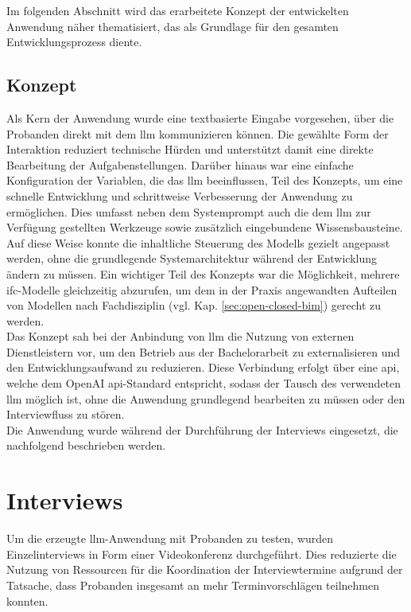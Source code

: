Im folgenden Abschnitt wird das erarbeitete Konzept der entwickelten Anwendung näher thematisiert, das als Grundlage für den gesamten Entwicklungsprozess diente.

\subsection{Konzept}
\label{sec:app-concept}

Als Kern der Anwendung wurde eine textbasierte Eingabe vorgesehen, über die Probanden direkt mit dem \gls{llm} kommunizieren können.
Die gewählte Form der Interaktion reduziert technische Hürden und unterstützt damit eine direkte Bearbeitung der Aufgabenstellungen.
Darüber hinaus war eine einfache Konfiguration der Variablen, die das \gls{llm} beeinflussen, Teil des Konzepts, um eine schnelle Entwicklung und schrittweise Verbesserung der Anwendung zu ermöglichen.
Dies umfasst neben dem Systemprompt auch die dem \gls{llm} zur Verfügung gestellten Werkzeuge sowie zusätzlich eingebundene Wissensbausteine.
Auf diese Weise konnte die inhaltliche Steuerung des Modells gezielt angepasst werden, ohne die grundlegende Systemarchitektur während der Entwicklung ändern zu müssen.
Ein wichtiger Teil des Konzepts war die Möglichkeit, mehrere \gls{ifc}-Modelle gleichzeitig abzurufen, 
um dem in der Praxis angewandten Aufteilen von Modellen nach Fachdisziplin (vgl. Kap. \ref{sec:open-closed-bim}) gerecht zu werden. \\

Das Konzept sah bei der Anbindung von \gls{llm} die Nutzung von externen Dienstleistern vor, 
um den Betrieb aus der Bachelorarbeit zu externalisieren und den Entwicklungsaufwand zu reduzieren.
Diese Verbindung erfolgt über eine \gls{api}, welche dem OpenAI \gls{api}-Standard entspricht,
sodass der Tausch des verwendeten \gls{llm} möglich ist, ohne die Anwendung grundlegend bearbeiten zu müssen oder den Interviewfluss zu stören. \\

Die Anwendung wurde während der Durchführung der Interviews eingesetzt, die nachfolgend beschrieben werden.

\section{Interviews}
\label{sec:interviews}

Um die erzeugte \gls{llm}-Anwendung mit Probanden zu testen, wurden Einzelinterviews in Form einer Videokonferenz durchgeführt.
Dies reduzierte die Nutzung von Ressourcen für die Koordination der Interviewtermine aufgrund der Tatsache, dass Probanden insgesamt an mehr Terminvorschlägen teilnehmen konnten.

